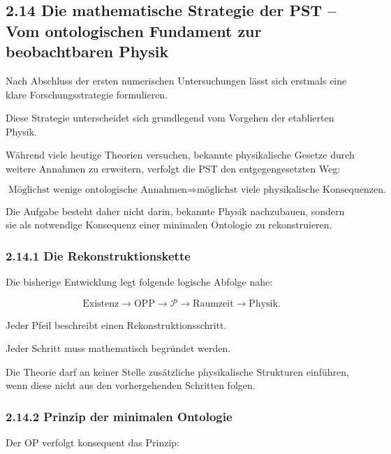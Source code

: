 \subsection{2.14 Die mathematische Strategie der PST – Vom ontologischen Fundament zur beobachtbaren Physik}

Nach Abschluss der ersten numerischen Untersuchungen lässt sich erstmals eine
klare Forschungsstrategie formulieren.

Diese Strategie unterscheidet sich grundlegend vom Vorgehen der etablierten
Physik.

Während viele heutige Theorien versuchen, bekannte physikalische Gesetze durch
weitere Annahmen zu erweitern, verfolgt die PST den entgegengesetzten Weg:

\[
\boxed{
\text{Möglichst wenige ontologische Annahmen}
\Longrightarrow
\text{möglichst viele physikalische Konsequenzen.}
}
\]

Die Aufgabe besteht daher nicht darin, bekannte Physik nachzubauen,
sondern sie als notwendige Konsequenz einer minimalen Ontologie zu rekonstruieren.


\subsubsection*{2.14.1 Die Rekonstruktionskette}

Die bisherige Entwicklung legt folgende logische Abfolge nahe:

\[
\boxed{
\text{Existenz}
\longrightarrow
\text{OPP}
\longrightarrow
\mathcal P
\longrightarrow
\text{Raumzeit}
\longrightarrow
\text{Physik}.
}
\]

Jeder Pfeil beschreibt einen Rekonstruktionsschritt.

Jeder Schritt muss mathematisch begründet werden.

Die Theorie darf an keiner Stelle zusätzliche physikalische Strukturen
einführen, wenn diese nicht aus den vorhergehenden Schritten folgen.


\subsubsection*{2.14.2 Prinzip der minimalen Ontologie}

Der OP verfolgt konsequent das Prinzip:

